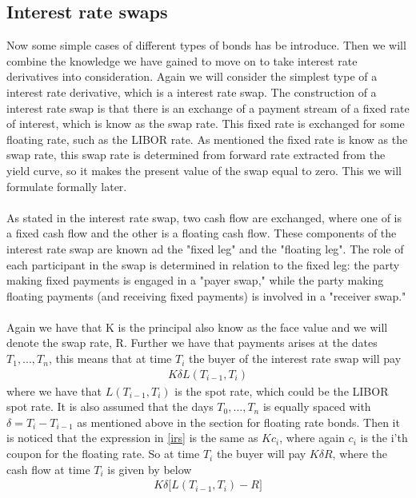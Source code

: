 \subsection{Interest rate swaps}
Now some simple cases of different types of bonds has be introduce. Then we will combine the knowledge we have gained to move on
to take interest rate derivatives into consideration. Again we will consider the simplest type of a interest rate derivative, which is a
interest rate swap. The construction of a interest rate swap is that there is an  exchange of a payment stream of a fixed rate of interest,
which is know as the swap rate. This fixed rate is exchanged for some floating rate, such as the LIBOR rate. 
As mentioned the fixed rate is know as the swap rate, this swap rate is determined from forward rate extracted from the yield curve, 
so it makes the present value of the swap equal to zero. This we will formulate formally later. 
\\\\
As stated in the interest rate swap, two cash flow are exchanged, where one of is a 
fixed cash flow and the other is a floating cash flow. These components of
the interest rate swap are known ad the "fixed leg" and the "floating leg". 
The role of each participant in the swap is determined in relation to the 
fixed leg: the party making fixed payments is engaged in a "payer swap," 
while the party making floating payments (and receiving fixed payments) is
 involved in a "receiver swap."
\\\\
Again we have that K is the principal also know as the face value and we will denote the swap rate, R.
Further we have that payments
arises at the dates $T_1,...,T_n$, this means that at time $T_i$ the buyer of the interest rate swap will pay
\begin{align}
    K \delta L(T_{i-1},T_i)
    \label{irs}
\end{align}
where we have that $L(T_{i-1},T_i)$ is the spot rate, which could be the LIBOR spot rate.
It is also assumed
that the days $T_0,...,T_n$ is equally spaced with $\delta = T_i - T_{i-1}$ as mentioned above in the section for floating rate bonds. 
Then it is noticed that the expression in \autoref{irs} is the same as $Kc_i$, where again $c_i$ is the i'th coupon for the floating rate. 
So at time $T_i$ the buyer will pay $K \delta R$, where the cash flow at time $T_i$ is given by below
\begin{align*}
    K \delta \Big[L(T_{i-1},T_i)-R \Big]
\end{align*}
